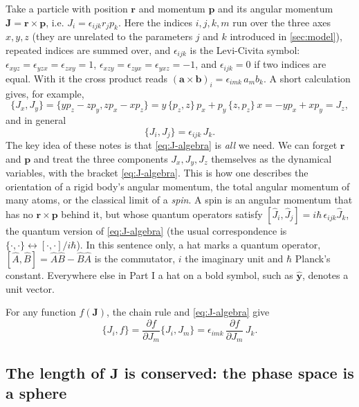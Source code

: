 \documentclass[11pt,a4paper]{article}
\newcommand{\vJ}{\bm{J}}
\newcommand{\PB}[2]{\{#1,#2\}}
\begin{document}
Take a particle with position $\bm r$ and momentum $\bm p$ and its angular momentum $\vJ = \bm r \times \bm p$, i.e.
$J_i = \epsilon_{ijk} r_j p_k$. Here the indices $i,j,k,m$ run over the three axes $x,y,z$ (they are unrelated to
the parameters $j$ and $k$ introduced in \cref{sec:model}), repeated indices are summed over, and $\epsilon_{ijk}$ is the
Levi-Civita symbol: $\epsilon_{xyz} = \epsilon_{yzx} = \epsilon_{zxy} = 1$, $\epsilon_{xzy} = \epsilon_{zyx} =
\epsilon_{yxz} = -1$, and $\epsilon_{ijk} = 0$ if two indices are equal. With it the cross product reads $(\bm a\times
\bm b)_i = \epsilon_{imk}\,a_m b_k$. A short calculation gives, for example,
\begin{equation*}
  \PB{J_x}{J_y} = \PB{y p_z - z p_y}{z p_x - x p_z}
  = y\,\PB{p_z}{z}\,p_x + p_y\,\PB{z}{p_z}\,x = -y p_x + x p_y = J_z ,
\end{equation*}
and in general
\begin{equation}\label{eq:J-algebra}
  \boxed{\PB{J_i}{J_j} = \epsilon_{ijk}\, J_k .}
\end{equation}
The key idea of these notes is that \eqref{eq:J-algebra} is \emph{all} we need. We can forget $\bm r$ and $\bm p$
and treat the three components $J_x, J_y, J_z$ themselves as the dynamical variables, with the bracket
\eqref{eq:J-algebra}. This is how one describes the orientation of a rigid body's angular momentum, the total angular
momentum of many atoms, or the classical limit of a \emph{spin}. A spin is an angular momentum that has no
$\bm r \times \bm p$ behind it, but whose quantum operators satisfy $[\hat J_i,\hat J_j] = i\hbar\,\epsilon_{ijk}\hat
J_k$, the quantum version of \eqref{eq:J-algebra} (the usual correspondence is $\PB{\cdot}{\cdot} \leftrightarrow
[\cdot,\cdot]/i\hbar$). In this sentence only, a hat marks a quantum operator, $[\hat A,\hat B] = \hat A\hat B -
\hat B\hat A$ is the commutator, $i$ the imaginary unit and $\hbar$ Planck's constant. Everywhere else in Part I a hat
on a bold symbol, such as $\hat{\bm y}$, denotes a unit vector.

For any function $f(\vJ)$, the chain rule and \eqref{eq:J-algebra} give
\begin{equation}\label{eq:J-f-bracket}
  \PB{J_i}{f} = \frac{\partial f}{\partial J_m}\PB{J_i}{J_m} = \epsilon_{imk}\,\frac{\partial f}{\partial J_m}\, J_k .
\end{equation}

\subsection{The length of \texorpdfstring{$\vJ$}{J} is conserved: the phase space is a sphere}
\end{document}
